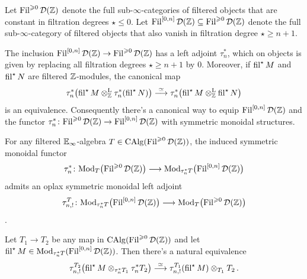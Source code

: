 \documentclass[DIV=12,numbers=enddot,leqno,bibliography=totoc]{scrartcl}
\begin{document}
	\begin{lem}\label{lem:TruncatedFilteredObjects}
		Let $\operatorname{Fil}^{\geqslant 0}\mathcal{D}(\mathbb{Z})$ denote the full sub-$\infty$-categories of filtered objects that are constant in filtration degrees $\star\leqslant 0$. Let $\operatorname{Fil}^{[0,n]}\mathcal{D}(\mathbb{Z})\subseteq \operatorname{Fil}^{\geqslant 0}\mathcal{D}(\mathbb{Z})$ denote the full sub-$\infty$-category of filtered objects that also vanish in filtration degree $\star\geqslant n+1$.
		\begin{alphanumerate}
			\item The inclusion  $\operatorname{Fil}^{[0,n]}\mathcal{D}(\mathbb{Z})\rightarrow\operatorname{Fil}^{\geqslant 0}\mathcal{D}(\mathbb{Z})$ has a left adjoint $\tau_n^*$, which on objects is given by replacing all filtration degrees $\star\geqslant n+1$ by $0$. Moreover, if $\operatorname{fil}^\star M$ and $\operatorname{fil}^\star N$ are filtered $\mathbb{Z}$-modules, the canonical map\label{enum:TruncationSymmetricMonoidal}
			\begin{equation*}
				\tau_n^*\left(\fil^\star M\lotimes_{\IZ}\tau_n^*(\fil^\star N)\right)\overset{\simeq}{\longrightarrow}\tau_n^*\left(\fil^\star M\lotimes_{\IZ}\fil^\star N\right)
			\end{equation*}
			is an equivalence. Consequently there's a canonical way to equip $\operatorname{Fil}^{[0,n]}\mathcal{D}(\mathbb{Z})$ and the functor $\tau_n^*\colon \Fil^{\geqslant 0}\Dd(\IZ)\rightarrow \Fil^{[0,n]}\Dd(\IZ)$ with symmetric monoidal structures.
			\item For any filtered $\mathbb{E}_\infty$-algebra $T\in\operatorname{CAlg}(\operatorname{Fil}^{\geqslant 0}\mathcal{D}(\mathbb{Z}))$, the induced symmetric monoidal functor
			\begin{equation*}
				\tau_n^*\colon \Mod_{T}\bigl(\Fil^{\geqslant 0}\Dd(\IZ)\bigr)\longrightarrow \Mod_{\tau_n^*T}\bigl(\Fil^{[0,n]}\Dd(\IZ)\bigr)
			\end{equation*}
			admits an oplax symmetric monoidal left adjoint\label{enum:TruncationLeftAdjoint}
			\begin{equation*}
				\tau_{n,!}^T\colon  \Mod_{\tau_n^*T}\bigl(\Fil^{[0,n]}\Dd(\IZ)\bigr)\longrightarrow\Mod_{T}\bigl(\Fil^{\geqslant 0}\Dd(\IZ)\bigr)
			\end{equation*}
			.
			\item Let $T_1\rightarrow T_2$ be any map in $\operatorname{CAlg}(\operatorname{Fil}^{\geqslant 0}\mathcal{D}(\mathbb{Z}))$ and let $\operatorname{fil}^\star M\in \operatorname{Mod}_{\tau_n^*T}(\operatorname{Fil}^{[0,n]}\mathcal{D}(\mathbb{Z}))$. Then there's a natural equivalence\label{enum:TruncationProjectionFormula}
			\begin{equation*}
				\tau_{n,!}^{T_2}\left(\fil^\star M\otimes_{\tau_n^*T_1}\tau_n^*T_2\right)\overset{\simeq}{\longrightarrow}\tau_{n,!}^{T_1}(\fil^\star M)\otimes_{T_1} T_2\,.
			\end{equation*}
		\end{alphanumerate}
	\end{lem}
\end{document}
